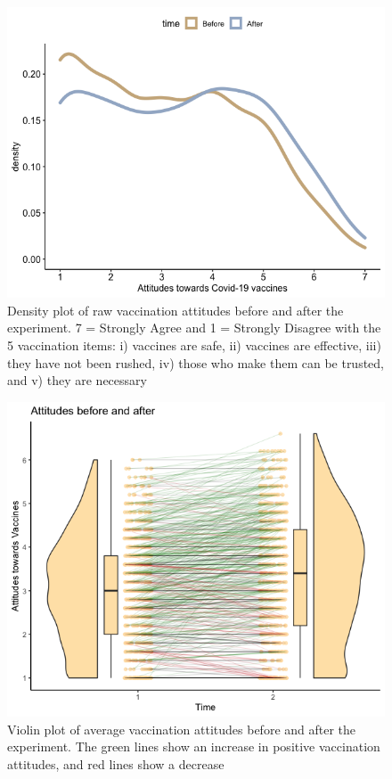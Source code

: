 \documentclass[
  english,
  ,jou,floatsintext]{apa6}
\begin{document}
\begin{figure}

{\centering \includegraphics[width=1\linewidth]{../plots/raw_density} 

}

\caption{Density plot of raw vaccination attitudes before and after the experiment. 7 = Strongly Agree and 1 = Strongly Disagree with the 5 vaccination items: i) vaccines are safe, ii) vaccines are effective, iii) they have not been rushed, iv) those who make them can be trusted, and v) they are necessary}\label{fig:rawdensity}
\end{figure}

\begin{figure}

{\centering \includegraphics[width=1\linewidth]{../plots/before_and_after_violin} 

}

\caption{Violin plot of average vaccination attitudes before and after the experiment. The green lines show an increase in positive vaccination attitudes, and red lines show a decrease}\label{fig:beforeafter}
\end{figure}
\end{document}
